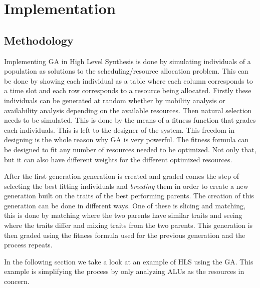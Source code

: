 \documentclass[conference]{IEEEtran}
\begin{document}
\section{Implementation}

\subsection{Methodology}

Implementing GA in High Level Synthesis is done by simulating individuals of a population as solutions to the scheduling/resource allocation problem. This can be done by showing each individual as a table where each column corresponds to a time slot and each row corresponds to a resource being allocated. Firstly these individuals can be generated at random whether by mobility analysis or availability analysis depending on the available resources. Then natural selection needs to be simulated\cite{daalder1996high}. This is done by the means of a fitness function that grades each individuals. This is left to the designer of the system. This freedom in designing is the whole reason why GA is very powerful. The fitness formula can be designed to fit any number of resources needed to be optimized. Not only that, but it can also have different weights for the different optimized resources. 

After the first generation generation is created and graded comes the step of selecting the best fitting individuals and \textit{breeding} them in order to create a new generation built on the traits of the best performing parents. The creation of this generation can be done in different ways. One of these is slicing and matching, this is done by matching where the two parents have similar traits and seeing where the traits differ and mixing traits from the two parents. This generation is then graded using the fitness formula used for the previous generation and the process repeats.

In the following section we take a look at an example of HLS using the GA. This example is simplifying the process by only analyzing ALUs as the resources in concern.
\end{document}
